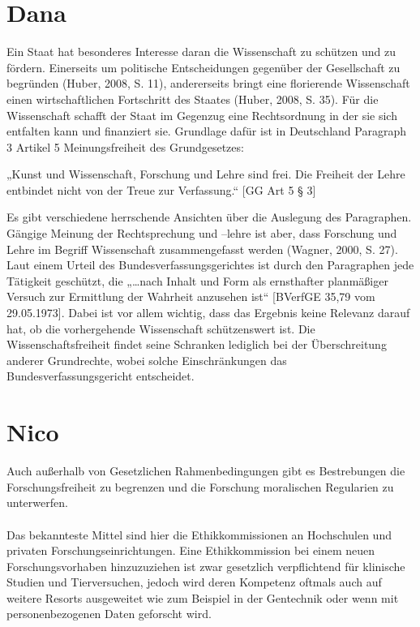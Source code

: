 \documentclass{pmwk}
\begin{document}
\section*{Dana}
Ein Staat hat besonderes Interesse daran die Wissenschaft zu schützen und zu fördern. Einerseits um politische Entscheidungen gegenüber der Gesellschaft zu begründen (Huber, 2008, S. 11), andererseits bringt eine florierende Wissenschaft einen wirtschaftlichen Fortschritt des Staates (Huber, 2008, S. 35). Für die Wissenschaft schafft der Staat im Gegenzug eine Rechtsordnung in der sie sich entfalten kann und finanziert sie. Grundlage dafür ist in Deutschland Paragraph 3 Artikel 5 Meinungsfreiheit des Grundgesetzes:\par
„Kunst und Wissenschaft, Forschung und Lehre sind frei. Die Freiheit der Lehre entbindet nicht von der Treue zur Verfassung.“ [GG Art 5 § 3]\par
Es gibt verschiedene herrschende Ansichten über die Auslegung des Paragraphen. Gängige Meinung der Rechtsprechung und –lehre ist aber, dass Forschung und Lehre im Begriff Wissenschaft zusammengefasst werden (Wagner, 2000, S. 27). Laut einem Urteil des Bundesverfassungsgerichtes ist durch den Paragraphen jede Tätigkeit geschützt, die „…nach Inhalt und Form als ernsthafter planmäßiger Versuch zur Ermittlung der Wahrheit anzusehen ist“ [BVerfGE 35,79 vom 29.05.1973]. Dabei ist vor allem wichtig, dass das Ergebnis keine Relevanz darauf hat, ob die vorhergehende Wissenschaft schützenswert ist. Die Wissenschaftsfreiheit findet seine Schranken lediglich bei der Überschreitung anderer Grundrechte, wobei solche Einschränkungen das Bundesverfassungsgericht entscheidet.

\section*{Nico}
Auch außerhalb von Gesetzlichen Rahmenbedingungen gibt es Bestrebungen die Forschungsfreiheit zu begrenzen und die Forschung moralischen Regularien zu unterwerfen.\\\\

Das bekannteste Mittel sind hier die Ethikkommissionen an Hochschulen und privaten Forschungseinrichtungen. Eine Ethikkommission bei einem neuen Forschungsvorhaben hinzuzuziehen ist zwar gesetzlich verpflichtend für klinische Studien und Tierversuchen, jedoch wird deren Kompetenz oftmals auch auf weitere Resorts ausgeweitet wie zum Beispiel in der Gentechnik oder wenn mit personenbezogenen Daten geforscht wird.\\\\
\end{document}
